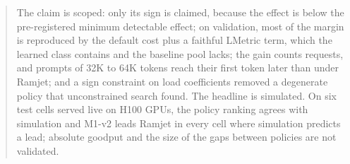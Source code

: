 \begin{abstract}
The claim is scoped: only its sign is claimed, because the effect is below the pre-registered
minimum detectable effect; on validation, most of the margin is reproduced by the default cost plus
a faithful LMetric term, which the learned class contains and the baseline pool lacks; the gain
counts requests, and prompts of 32K to 64K tokens reach their first token later than under Ramjet;
and a sign constraint on load coefficients removed a degenerate policy that unconstrained search
found.
The headline is simulated. On six test cells served live on H100 GPUs, the policy ranking agrees
with simulation and M1-v2 leads Ramjet in every cell where simulation predicts a lead; absolute
goodput and the size of the gaps between policies are not validated.
\end{abstract}
